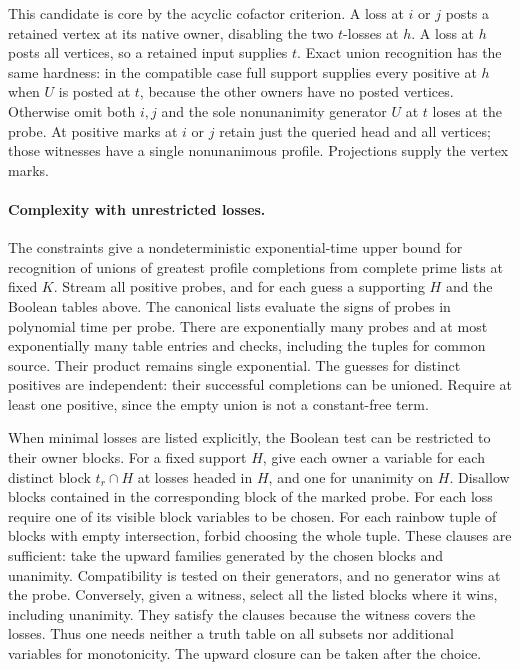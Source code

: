 This candidate is core by the acyclic cofactor criterion.
A loss at $i$ or $j$ posts a retained vertex at its native
owner, disabling the two $t$-losses at $h$. A loss at $h$
posts all vertices, so a retained input supplies $t$.
Exact union recognition has the same hardness: in the
compatible case full support supplies every positive at $h$
when $U$ is posted at $t$, because the other owners have
no posted vertices. Otherwise omit both $i,j$ and the
sole nonunanimity generator $U$ at $t$ loses at the probe.
At positive marks at $i$ or $j$ retain just the queried
head and all vertices; those witnesses have a single
nonunanimous profile. Projections supply the vertex marks.

\paragraph{Complexity with unrestricted losses.}
The constraints give a nondeterministic exponential-time upper
bound for recognition of unions of greatest profile completions
from complete prime lists at fixed $K$. Stream all positive
probes, and for each guess a supporting $H$ and the Boolean
tables above. The canonical lists evaluate the signs of probes
in polynomial time per probe. There are exponentially many
probes and at most exponentially many table entries and checks,
including the tuples for common source. Their product remains
single exponential. The guesses for distinct positives are
independent: their successful completions can be unioned.
Require at least one positive, since the empty union is
not a constant-free term.

When minimal losses are listed explicitly, the Boolean test can
be restricted to their owner blocks. For a fixed support $H$,
give each owner a variable for each distinct block $t_r\cap H$
at losses headed in $H$, and one for unanimity on $H$. Disallow
blocks contained in the corresponding block of the marked probe.
For each loss require one of its visible block variables to be
chosen. For each rainbow tuple of blocks with empty intersection,
forbid choosing the whole tuple. These clauses are sufficient:
take the upward families generated by the chosen blocks and
unanimity. Compatibility is tested on their generators, and
no generator wins at the probe. Conversely, given a witness,
select all the listed blocks where it wins, including unanimity.
They satisfy the clauses because the witness covers the losses.
Thus one needs neither a truth table on all subsets nor
additional variables for monotonicity. The upward closure can
be taken after the choice.


